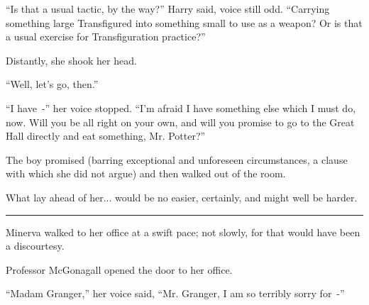 ``Is that a usual tactic, by the way?'' Harry said, voice still odd. ``Carrying something large Transfigured into something small to use as a weapon? Or is that a usual exercise for Transfiguration practice?''

Distantly, she shook her head.

``Well, let's go, then.''

``I have~-'' her voice stopped. ``I'm afraid I have something else which I must do, now. Will you be all right on your own, and will you promise to go to the Great Hall directly and eat something, Mr. Potter?''

The boy promised (barring exceptional and unforeseen circumstances, a clause with which she did not argue) and then walked out of the room.

What lay ahead of her... would be no easier, certainly, and might well be harder.

\begin{center}\rule{3in}{0.4pt}\end{center}

Minerva walked to her office at a swift pace; not slowly, for that would have been a discourtesy.

Professor McGonagall opened the door to her office.

``Madam Granger,'' her voice said, ``Mr. Granger, I am so terribly sorry for~-''
